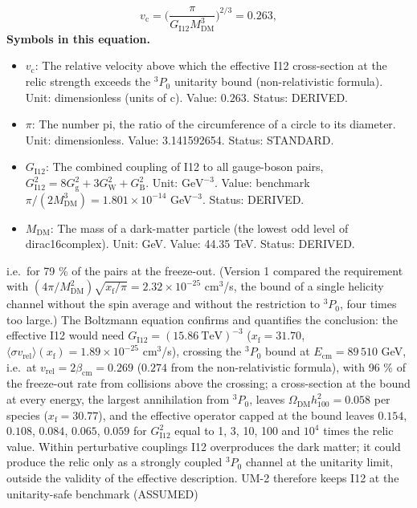 \documentclass[
  10pt,
]{article}
\providecommand{\tightlist}{%
  \setlength{\itemsep}{0pt}\setlength{\parskip}{0pt}}
\begin{document}
\[ v_{\mathrm{c}} = \Big(\frac{\pi}{G_{\mathrm{I12}}M_{\mathrm{DM}}^3}\Big)^{2/3} = 0.263, \]
\textbf{Symbols in this equation.}

\begin{itemize}
\tightlist
\item
  \(v_{\mathrm{c}}\): The relative velocity above which the effective
  I12 cross-section at the relic strength exceeds the \(^3P_0\)
  unitarity bound (non-relativistic formula). Unit: dimensionless (units
  of c). Value: \(0.263\). Status: DERIVED.
\item
  \(\pi\): The number pi, the ratio of the circumference of a circle to
  its diameter. Unit: dimensionless. Value: 3.141592654. Status:
  STANDARD.
\item
  \(G_{\mathrm{I12}}\): The combined coupling of I12 to all gauge-boson
  pairs,
  \(G_{\mathrm{I12}}^2 = 8G_{\mathrm{g}}^2 + 3G_{\mathrm{W}}^2 + G_{\mathrm{B}}^2\).
  Unit: \(\mathrm{GeV}^{-3}\). Value: benchmark
  \(\pi/(2M_{\mathrm{DM}}^3) = 1.801\times10^{-14}\) GeV\(^{-3}\).
  Status: DERIVED.
\item
  \(M_{\mathrm{DM}}\): The mass of a dark-matter particle (the lowest
  odd level of dirac16complex). Unit: GeV. Value: 44.35 TeV. Status:
  DERIVED.
\end{itemize}

i.e.~for 79 \% of the pairs at the freeze-out. (Version 1 compared the
requirement with
\((4\pi/M_{\mathrm{DM}}^2)\sqrt{x_{\mathrm{f}}/\pi} = 2.32\times10^{-25}\)
cm\(^3\)/s, the bound of a single helicity channel without the spin
average and without the restriction to \(^3P_0\), four times too large.)
The Boltzmann equation confirms and quantifies the conclusion: the
effective I12 would need \(G_{\mathrm{I12}} = (15.86\ \text{TeV})^{-3}\)
(\(x_{\mathrm{f}} = 31.70\),
\(\langle\sigma v_{\mathrm{rel}}\rangle(x_{\mathrm{f}}) = 1.89\times10^{-25}\)
cm\(^3\)/s), crossing the \(^3P_0\) bound at
\(E_{\mathrm{cm}} = 89\,510\) GeV, i.e.~at
\(v_{\mathrm{rel}} = 2\beta_{\mathrm{cm}} = 0.269\) (\(0.274\) from the
non-relativistic formula), with 96 \% of the freeze-out rate from
collisions above the crossing; a cross-section at the bound at every
energy, the largest annihilation from \(^3P_0\), leaves
\(\Omega_{\mathrm{DM}}h_{100}^2 = 0.058\) per species
(\(x_{\mathrm{f}} = 30.77\)), and the effective operator capped at the
bound leaves \(0.154\), \(0.108\), \(0.084\), \(0.065\), \(0.059\) for
\(G_{\mathrm{I12}}^2\) equal to 1, 3, 10, 100 and \(10^4\) times the
relic value. Within perturbative couplings I12 overproduces the dark
matter; it could produce the relic only as a strongly coupled \(^3P_0\)
channel at the unitarity limit, outside the validity of the effective
description. UM-2 therefore keeps I12 at the unitarity-safe benchmark
(ASSUMED)
\end{document}
